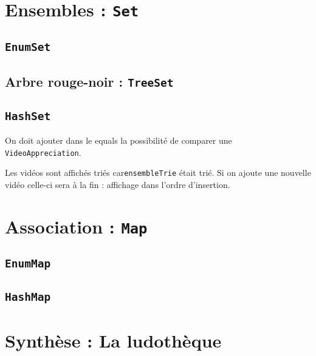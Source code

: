 \documentclass[12pt,a4paper,openany]{book}
\begin{document}
	\chapter{Ensembles : \texttt{Set}}
	\section{\texttt{EnumSet}}
		
	\section{Arbre rouge-noir : \texttt{TreeSet}}
		
		
	\section{\texttt{HashSet}}
		
		
		

	On doit ajouter dans le equals la possibilité de comparer une \texttt{VideoAppreciation}.
		
		
	Les vidéos sont affichés triés car\texttt{ensembleTrie} était trié. Si on ajoute une nouvelle vidéo celle-ci sera à la fin : affichage dans
	l'ordre d'insertion.

	\chapter{Association : \texttt{Map}}
	\section{\texttt{EnumMap}}
		
	
	\section{\texttt{HashMap}}
		
		
		
		
	\chapter{Synthèse : La ludothèque}
		
		
		
		
	\appendix
	\lstlistoflistings
\end{document}
